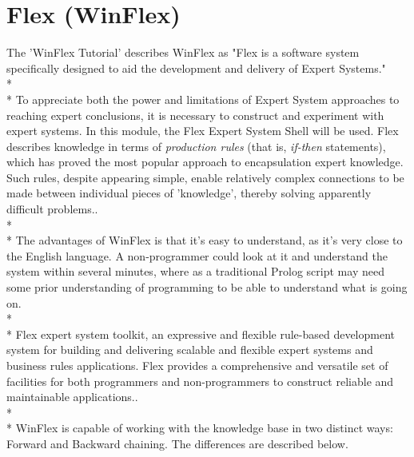 \documentclass[12pt]{report}
\begin{document}
\section{Flex (WinFlex)}\label{sec:introflex}
The 'WinFlex Tutorial' describes WinFlex as "Flex is a software system specifically designed to aid the development and delivery of Expert Systems."
\\*
\\*
To appreciate both the power and limitations of Expert System approaches to reaching expert conclusions, it is necessary to construct and experiment with expert systems.  In this module, the Flex Expert System Shell will be used.  Flex describes knowledge in terms of \textit{production rules} (that is, \textit{if-then} statements), which has proved the most popular approach to encapsulation expert knowledge.  Such rules, despite appearing simple, enable relatively complex connections to be made between individual pieces of 'knowledge', thereby solving apparently difficult problems.\citep{flexsystems09}.
\\*
\\*
The advantages of WinFlex is that it's easy to understand, as it's very close to the English language.  A non-programmer could look at it and understand the system within several minutes, where as a traditional Prolog script may need some prior understanding of programming to be able to understand what is going on.
\\*
\\*
Flex expert system toolkit, an expressive and flexible rule-based development system for building and delivering scalable and flexible expert systems and business rules applications. Flex provides a comprehensive and versatile set of facilities for both programmers and non-programmers to construct reliable and maintainable applications.\citep{lpawinprolog-flex}.
\\*
\\*
WinFlex is capable of working with the knowledge base in two distinct ways: Forward and Backward chaining.  The differences are described below.
\end{document}
